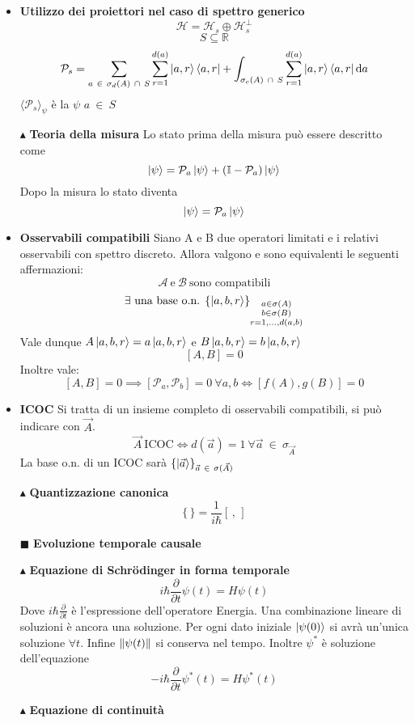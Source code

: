 \documentclass{book}
\newcommand{\g}{\textbf}
\newcommand{\e}{\begin{equation}}
\newcommand{\ex}{\end{equation} }
\renewcommand{\it}{\item[$\cdot$]}
\begin{document}
\begin{multicols}{4}
\begin{itemize}
\it \g{Utilizzo dei proiettori nel caso di spettro generico }
\e{\mathcal{H} = \mathcal{H}_{s} \oplus \mathcal{H}_{s}^{\perp}}\ex
\e{S \subseteq \mathbb{R} }\ex
\e{\mathcal{P}_{s} = \sum_{a \ \in \ \sigma_{d}(A)\ \cap \ S} \sum_{r = 1}^{d(a)}\ket{a,r}\bra{a,r} + \int_{\sigma_{c}(A) \ \cap \ S} \sum_{r = 1}^{d(a)}\ket{a,r}\bra{a,r}\text{d}a   }\ex
$\langle \mathcal{P}_{s} \rangle_{\psi}$ è la   $\psi$  $a \  \in \ S$
\item  [$\blacktriangle$] \g{Teoria della misura}
Lo stato prima della misura può essere descritto come 
\e{\ket{\psi} = \mathcal{P}_{a}\ket{\psi} + \left(\mathbb{I}-\mathcal{P}_{a}\right)\ket{\psi}}\ex
Dopo la misura lo stato diventa
\e{\ket{\psi} = \mathcal{P}_{a}\ket{\psi}}\ex
\it \g{Osservabili compatibili}
Siano A e B due operatori limitati e i relativi osservabili con spettro discreto. Allora valgono e  sono equivalenti le seguenti affermazioni:
\e{\mathcal{A} \ \text{e} \ \mathcal{B}\ \text{sono compatibili}}\ex
\e{ \exists \text{ una base o.n. } \{ \ket{a, b, r} \}_{\substack{a \in \sigma(A)  \\ b \in \sigma(B)  \\ r = 1, \dots, d(a, b)}}}\ex
Vale dunque $A\ket{a,b,r} = a\ket{a,b,r}$ e $B\ket{a,b,r} = b\ket{a,b,r}$
\e{[A,B] = 0}\ex
Inoltre vale:
\e{[A,B] = 0 \implies [\mathcal{P}_{a}, \mathcal{P}_{b}] = 0 \ \forall a,b \iff [f(A), g(B)] = 0}\ex
\it \g{ICOC}
Si tratta di un insieme completo di osservabili compatibili, si può indicare con $\vec{A}$. 
\e{\vec{A} \ \text{ICOC} \iff d(\vec{a}) = 1 \ \forall \vec{a} \ \in \ \sigma_{\vec{A}}}\ex
La base o.n. di un ICOC sarà $\{\ket{\vec{a}}\}_{\vec{a} \ \in \ \sigma(\vec{A})}$
\item [$\blacktriangle$] \g{Quantizzazione canonica}
\e{\{ \, \} = \frac{1}{i \hbar} \left[ \, , \, \right]}\ex
\item [$\blacksquare$] \g{Evoluzione temporale causale}
\item [$\blacktriangle$] \g{Equazione di Schrödinger in forma temporale}
        \e{i\hbar \frac{\partial}{\partial t} \psi(t) = H\psi(t)} \ex
    Dove $i \hbar \frac{\partial}{\partial t} $ è l'espressione dell'operatore Energia.
Una combinazione lineare di soluzioni è ancora una soluzione. Per ogni dato iniziale $\ket{\psi(0)}$ si avrà un'unica soluzione $\forall t$. Infine $\norm{\psi(t)}$ si conserva nel tempo. 
Inoltre $\psi^{*}$ è soluzione dell'equazione
\e{-i \hbar \frac{\partial}{\partial t} \psi^{*}(t) = H\psi^{*}(t) }\ex
\item [$\blacktriangle$] \g{Equazione di continuità}

\end{itemize}
\end{multicols}
\end{document}
